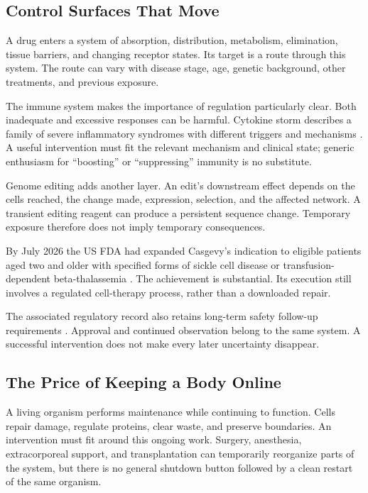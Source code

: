 \subsection{Control Surfaces That Move}

A drug enters a system of absorption, distribution, metabolism, elimination, tissue barriers, and changing receptor states. Its target is a route through this system. The route can vary with disease stage, age, genetic background, other treatments, and previous exposure.

The immune system makes the importance of regulation particularly clear. Both inadequate and excessive responses can be harmful. Cytokine storm describes a family of severe inflammatory syndromes with different triggers and mechanisms \cite{fajgenbaum2020cytokinestorm}. A useful intervention must fit the relevant mechanism and clinical state; generic enthusiasm for “boosting” or “suppressing” immunity is no substitute.

Genome editing adds another layer. An edit's downstream effect depends on the cells reached, the change made, expression, selection, and the affected network. A transient editing reagent can produce a persistent sequence change. Temporary exposure therefore does not imply temporary consequences.

By July 2026 the US FDA had expanded Casgevy's indication to eligible patients aged two and older with specified forms of sickle cell disease or transfusion-dependent beta-thalassemia \cite{fda2026casgevy}. The achievement is substantial. Its execution still involves a regulated cell-therapy process, rather than a downloaded repair.

The associated regulatory record also retains long-term safety follow-up requirements \cite{fda2026casgevyletter}. Approval and continued observation belong to the same system. A successful intervention does not make every later uncertainty disappear.

\subsection{The Price of Keeping a Body Online}

A living organism performs maintenance while continuing to function. Cells repair damage, regulate proteins, clear waste, and preserve boundaries. An intervention must fit around this ongoing work. Surgery, anesthesia, extracorporeal support, and transplantation can temporarily reorganize parts of the system, but there is no general shutdown button followed by a clean restart of the same organism.

